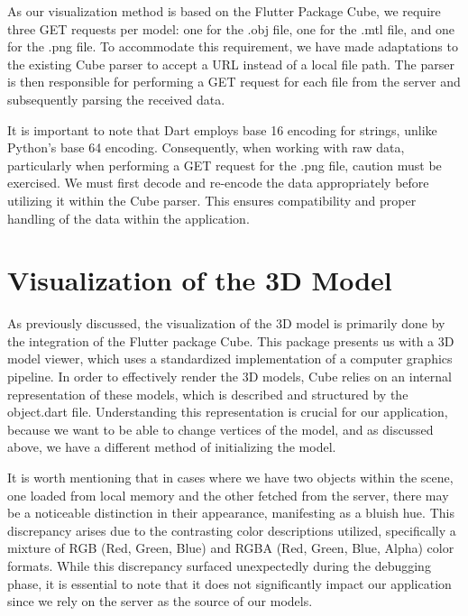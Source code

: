 As our visualization method is based on the Flutter Package Cube, we require three GET requests per model: one for the .obj file, one for 
the .mtl file, and one for the .png file. To accommodate this requirement, we have made adaptations to the existing Cube parser to accept 
a URL instead of a local file path. The parser is then responsible for performing a GET request for each file from the server and subsequently parsing the received data.

It is important to note that Dart employs base 16 encoding for strings, unlike Python's base 64 encoding. Consequently, when working with raw data, 
particularly when performing a GET request for the .png file, caution must be exercised. We must first decode and re-encode the data appropriately 
before utilizing it within the Cube parser. This ensures compatibility and proper handling of the data within the application.

\section{Visualization of the 3D Model}

As previously discussed, the visualization of the 3D model is primarily done by the integration of the Flutter package Cube. 
This package presents us with a 3D model viewer, which uses a standardized implementation of a computer graphics pipeline. 
In order to effectively render the 3D models, Cube relies on an internal representation of these models, which is described and structured by the object.dart file.
Understanding this representation is crucial for our application, because we want to be able to change vertices of the model, and as discussed above,
we have a different method of initializing the model.

It is worth mentioning that in cases where we have two objects within the scene, one loaded from local memory and the other fetched from the server, 
there may be a noticeable distinction in their appearance, manifesting as a bluish hue. This discrepancy arises due to the contrasting color descriptions utilized, 
specifically a mixture of RGB (Red, Green, Blue) and RGBA (Red, Green, Blue, Alpha) color formats. While this discrepancy surfaced unexpectedly during 
the debugging phase, it is essential to note that it does not significantly impact our application since we rely on the server as the source of our models.

